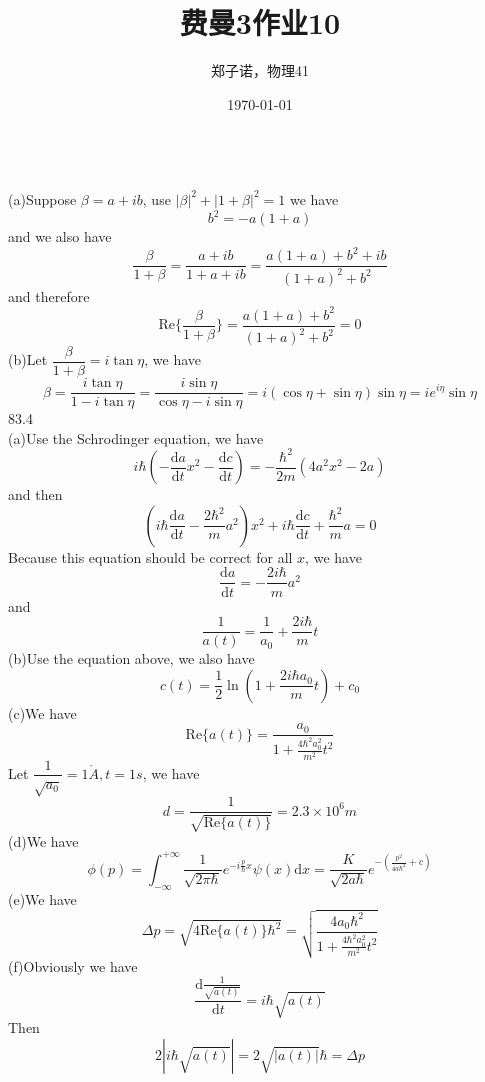 \documentclass[utf8]{ctexart}
\title{费曼3作业10}
\author{郑子诺，物理41}
\date{\today}
\begin{document}
\maketitle
{}\\
(a)Suppose $\beta=a+ib$, use $|\beta|^2+|1+\beta|^2=1$ we have
\[b^2=-a(1+a)\]
and we also have
\[\frac{\beta}{1+\beta}=\frac{a+ib}{1+a+ib}=\frac{a(1+a)+b^2+ib}{(1+a)^2+b^2}\]
and therefore
\[\mathrm{Re}\{\frac{\beta}{1+\beta}\}=\frac{a(1+a)+b^2}{(1+a)^2+b^2}=0\]
(b)Let $\dfrac{\beta}{1+\beta}=i\tan\eta$, we have
\[\beta=\frac{i\tan\eta}{1-i\tan\eta}=\frac{i\sin\eta}{\cos\eta-i\sin\eta}=i(\cos\eta+\sin\eta)\sin\eta=ie^{i\eta}\sin\eta\]
83.4\\
(a)Use the Schrodinger equation, we have
\[i\hbar(-\frac{\mathrm{d}a}{\mathrm{d}t}x^2-\frac{\mathrm{d}c}{\mathrm{d}t})=-\frac{\hbar^2}{2m}(4a^2x^2-2a)\]
and then
\[(i\hbar\frac{\mathrm{d}a}{\mathrm{d}t}-\frac{2\hbar^2}{m}a^2)x^2+i\hbar\frac{\mathrm{d}c}{\mathrm{d}t}+\frac{\hbar^2}{m}a=0\]
Because this equation should be correct for all $x$, we have
\[\frac{\mathrm{d}a}{\mathrm{d}t}=-\frac{2i\hbar}{m}a^2\]
and
\[\frac{1}{a(t)}=\frac{1}{a_0}+\frac{2i\hbar}{m}t\]
(b)Use the equation above, we also have
\[c(t)=\frac{1}{2}\ln(1+\frac{2i\hbar a_0}{m}t)+c_0\]
(c)We have
\[\mathrm{Re}\{a(t)\}=\frac{a_0}{1+\frac{4\hbar^2a_0^2}{m^2}t^2}\]
Let $\dfrac{1}{\sqrt{a_0}}=1\unit{\mathring{A}},t=1\unit{s}$, we have
\[d=\frac{1}{\sqrt{\mathrm{Re}\{a(t)\}}}=2.3\times 10^{6}\unit{m}\]
(d)We have
\[\phi(p)=\int_{-\infty}^{+\infty}\frac{1}{\sqrt{2\pi\hbar}}e^{-i\frac{p}{\hbar}x}\psi(x)\mathrm{d}x=\frac{K}{\sqrt{2a\hbar}}e^{-(\frac{p^2}{4a\hbar^2}+c)}\]
(e)We have
\[\Delta p=\sqrt{4\mathrm{Re}\{a(t)\}\hbar^2}=\sqrt{\frac{4a_0\hbar^2}{1+\frac{4\hbar^2a_0^2}{m^2}t^2}}\]
(f)Obviously we have
\[\frac{\mathrm{d}\frac{1}{\sqrt{a(t)}}}{\mathrm{d}t}=i\hbar\sqrt{a(t)}\]
Then
\[2|i\hbar\sqrt{a(t)}|=2\sqrt{|a(t)|}\hbar=\Delta p\]
\end{document}
